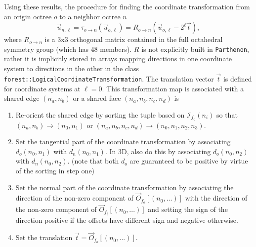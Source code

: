\documentclass{article}
\begin{document}
Using these results, the procedure for finding the coordinate transformation from an origin octree $o$ to a neighbor octree $n$ 
\begin{equation}
\vec{u}_{n, \ell} = 
\tau_{o \rightarrow n}(\vec{u}_{o, \ell}) = R_{o \rightarrow n} 
(\vec{u}_{o, \ell} - 2^\ell \vec{t}),
\end{equation}
where $R_{o \rightarrow n}$ is a 3x3 orthogonal matrix contained in the full octahedral symmetry group (which has 48 members). $R$ is not explicitly built in \texttt{Parthenon}, rather it is implicitly stored in arrays mapping directions in one coordinate system to directions in the other in the class \texttt{forest::LogicalCoordinateTransformation}. The translation vector $\vec{t}$ is defined for coordinate systems at $\ell = 0$.
This transformation map is associated with a shared edge $(n_a, n_b)$ or a shared face $(n_a, n_b, n_c, n_d)$ is 
\begin{enumerate}
\item Re-orient the shared edge by sorting the tuple based on $\mathcal{I}_{f_o}(n_i)$ so that $(n_a, n_b) \rightarrow (n_0, n_1)$ or $(n_a, n_b, n_c, n_d) \rightarrow (n_0, n_1, n_2, n_3)$.
\item Set the tangential part of the coordinate transformation by associating $d_o(n_0, n_1)$ with $d_n(n_0, n_1)$. In 3D, also do this by associating $d_o(n_0, n_2)$ with $d_n(n_0, n_2)$. (note that both $d_o$ are guaranteed to be positive by virtue of the sorting in step one) 
\item Set the normal part of the coordinate transformation by associating the direction of the non-zero component of $\vec{O}_{f_o}[(n_0, ...)]$ with the direction of the non-zero component of $\vec{O}_{f_i}[(n_0, ...)]$ and setting the sign of the direction positive if the offsets have different sign and negative otherwise.
\item Set the translation $\vec{t} = \vec{O}_{f_o}[(n_0, ...)]$. 
\end{enumerate}
\end{document}

